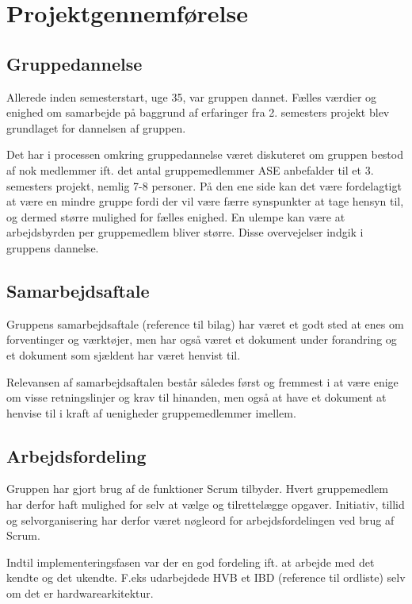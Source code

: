 \chapter*{Projektgennemførelse}
\section*{Gruppedannelse}
Allerede inden semesterstart, uge 35, var gruppen dannet. Fælles værdier og enighed om samarbejde på baggrund af erfaringer fra 2. semesters projekt blev grundlaget for dannelsen af gruppen.

Det har i processen omkring gruppedannelse været diskuteret om gruppen bestod af nok medlemmer ift. det antal gruppemedlemmer ASE anbefalder til et 3. semesters projekt, nemlig 7-8 personer. På den ene side kan det være fordelagtigt at være en mindre gruppe fordi der vil være færre synspunkter at tage hensyn til, og dermed større mulighed for fælles enighed. En ulempe kan være at arbejdsbyrden per gruppemedlem bliver større. Disse overvejelser indgik i gruppens dannelse.\\

\section*{Samarbejdsaftale}
Gruppens samarbejdsaftale (reference til bilag) har været et godt sted at enes om forventinger og værktøjer, men har også været et dokument under forandring og et dokument som sjældent har været henvist til. 

Relevansen af samarbejdsaftalen består således først og fremmest i at være enige om visse retningslinjer og krav til hinanden, men også at have et dokument at henvise til i kraft af uenigheder gruppemedlemmer imellem.

\section*{Arbejdsfordeling}
Gruppen har gjort brug af de funktioner Scrum tilbyder. Hvert gruppemedlem har derfor haft mulighed for selv at vælge og tilrettelægge opgaver. Initiativ, tillid og selvorganisering har derfor været nøgleord for arbejdsfordelingen ved brug af Scrum.

Indtil implementeringsfasen var der en god fordeling ift. at arbejde med det kendte og det ukendte. F.eks udarbejdede HVB et IBD (reference til ordliste) selv om det er hardwarearkitektur.

